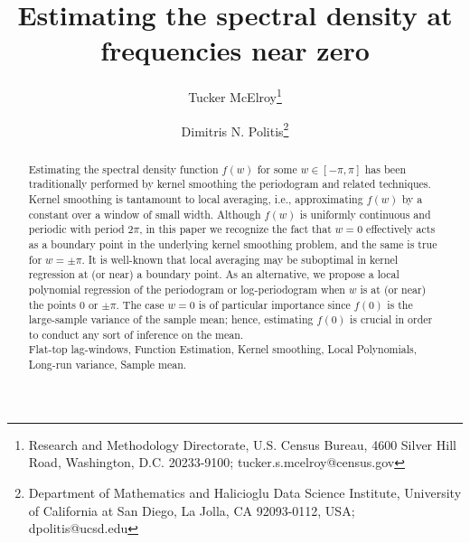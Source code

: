 \documentclass[12p E.Lt,psfig]{article} %
\def\tends{\rightarrow}
\begin{document}
\newtheorem{theorem}{Theorem}[section]
\newtheorem{lemma}{Lemma}[section]
\newtheorem{proposition}{Proposition}[section]
\newtheorem{corollary}{Corollary}[section]
\newtheorem{Remark}{Remark}[section]
\newtheorem{Example}{Example}[section]
\newtheorem{remark}{Remark}[section]
\newtheorem{algorithm}{Algorithm}[section]

\newcommand{\e}{\varepsilon}
\newcommand{\ex}{\mbox{E}}
\newcommand{\var}{\mbox{Var}}
\newcommand{\xast}{X^{\ast}}
\newcommand{\btheta}{\mbox{\boldmath  $\theta $}}
\newcommand{\btau}{\mbox{\boldmath  $\tau $}}
\newcommand{\bdelta}{\mbox{\boldmath  $\delta $}}
\def\tends{\rightarrow}



\newpage

\title{Estimating the spectral density at frequencies near zero }
\author{ Tucker McElroy\thanks{Research and Methodology Directorate, 
U.S. Census Bureau, 
4600 Silver Hill Road, 
Washington, D.C. 20233-9100;
tucker.s.mcelroy@census.gov}  \and  Dimitris N. Politis\thanks{Department of
Mathematics and Halicioglu Data Science Institute, 
University of California at San Diego, La Jolla, CA 92093-0112, USA;
      dpolitis@ucsd.edu}}
\date{}

 
\maketitle



 \begin{abstract}  Estimating the spectral density function
$f(w)$ for some  $w\in [-\pi, \pi]$ has been traditionally performed
by kernel smoothing the periodogram and related techniques.
Kernel smoothing is tantamount to local averaging, i.e., approximating
$f(w)$ by a constant over a window of small width.
Although $f(w)$ is uniformly continuous and periodic with period $2\pi$,
 in this paper we recognize the fact that  $w=0$   effectively
acts as a boundary point in the underlying kernel smoothing problem, and
the same is true for   $w=\pm \pi$.
It is well-known that local averaging may be  suboptimal in kernel regression
at (or near) a boundary point. As an alternative, we propose a
local polynomial regression of the periodogram or log-periodogram
when $w$ is at (or near) the points 0 or $\pm \pi$.
The case $w=0$ is of particular importance  since $f(0)$ is the large-sample
variance of the sample mean; hence,  estimating $f(0)$ is crucial in order to conduct
any sort of inference on the mean.
 \\
   Flat-top lag-windows, Function Estimation,  Kernel smoothing,
   Local Polynomials, Long-run variance, Sample mean.
\end{abstract}
\end{document}
